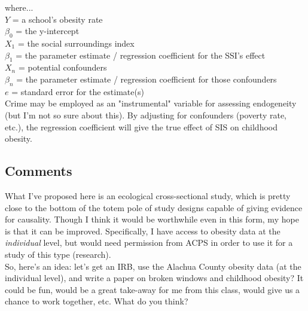 \documentclass[11pt]{article}
\begin{document}
\begin{multicols}{2}
where...\\

\noindent $ Y $ = a school's obesity rate\\
$ \beta_0 $ = the y-intercept \\
$ X_1$ = the social surroundings index \\
$ \beta_1$ = the parameter estimate / regression coefficient for the SSI's effect\\
$ X_n$ = potential confounders \\
$ \beta_n$ = the parameter estimate / regression coefficient for those confounders\\
$ e $ = standard error for the estimate(s)\\

Crime may be employed as an "instrumental" variable for assessing endogeneity (but I'm not so sure about this).  By adjusting for confounders (poverty rate, etc.), the regression coefficient will give the true effect of SIS on childhood obesity.

\subsection*{Comments}
What I've proposed here is an ecological cross-sectional study, which is pretty close to the bottom of the totem pole of study designs capable of giving evidence for causality.  Though I think it would be worthwhile even in this form, my hope is that it can be improved.  Specifically, I have access to obesity data at the \emph{individual} level, but would need permission from ACPS in order to use it for a study of this type (research). \\

So, here's an idea: let's get an IRB, use the Alachua County obesity data (at the individual level), and write a paper on broken windows and childhood obesity?  It could be fun, would be a great take-away for me from this class, would give us a chance to work together, etc.  What do you think?


\end{multicols}
\newpage


\end{document}

